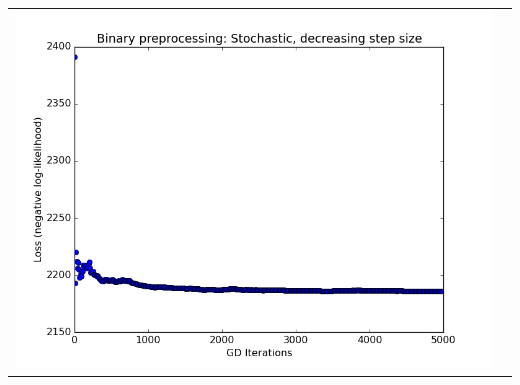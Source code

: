\documentclass[11pt]{article}
\begin{document}
\begin{enumerate}[1.]
\begin{tabular}{cc}
\includegraphics[scale=0.4]{images/p3_3_Binary} &
\end{tabular}
\end{enumerate}
\end{document}
